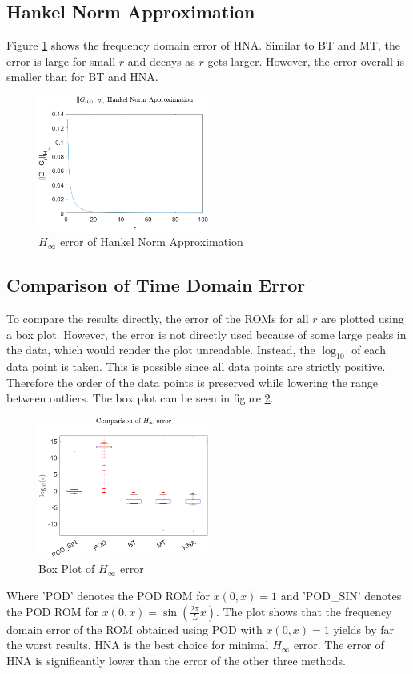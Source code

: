 \subsection{Hankel Norm Approximation}
Figure \ref{FIG-H-HNA} shows the frequency domain error of HNA.
Similar to BT and MT, the error is large for small \(r\) and decays as \(r\) gets larger.
However, the error overall is smaller than for BT and HNA.
\begin{figure}[H]
\centering
\includegraphics[width=0.5\textwidth]{images/freq/H_HNA}
\caption{$H_{\infty}$ error of Hankel Norm Approximation}
\label{FIG-H-HNA}
\end{figure}

\subsection{Comparison of Time Domain Error}
To compare the results directly, the error of the ROMs for all \(r\) are plotted using a box plot.
However, the error is not directly used because of some large peaks in the data, which would render the plot unreadable.
Instead, the \(\log_{10}\) of each data point is taken.
This is possible since all data points are strictly positive. Therefore the order of the data points is preserved while lowering the range between outliers.
The box plot can be seen in figure \ref{FIG-H-BOX}.
\begin{figure}[H]
\centering
\includegraphics[width=0.5\textwidth]{images/freq/H_BOX}
\caption{Box Plot of $H_{\infty}$ error}
\label{FIG-H-BOX}
\end{figure}
Where 'POD' denotes the POD ROM for \(x(0, x) = 1\) and 'POD\_SIN' denotes the POD ROM for \(x(0, x) =  \sin(\frac{2\pi}{L}x)\).
The plot shows that the frequency domain error of the ROM obtained using POD with \(x(0, x) = 1\) yields by far the worst results.
HNA is the best choice for minimal \(H_{\infty}\) error. 
The error of HNA is significantly lower than the error of the other three methods.

